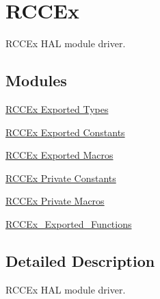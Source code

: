 \hypertarget{group___r_c_c_ex}{}\section{R\+C\+C\+Ex}
\label{group___r_c_c_ex}


R\+C\+C\+Ex H\+AL module driver.  


\subsection*{Modules}
\begin{DoxyCompactItemize}
\item 
\hyperlink{group___r_c_c_ex___exported___types}{R\+C\+C\+Ex Exported Types}
\item 
\hyperlink{group___r_c_c_ex___exported___constants}{R\+C\+C\+Ex Exported Constants}
\item 
\hyperlink{group___r_c_c_ex___exported___macros}{R\+C\+C\+Ex Exported Macros}
\item 
\hyperlink{group___r_c_c_ex___private___constants}{R\+C\+C\+Ex Private Constants}
\item 
\hyperlink{group___r_c_c_ex___private___macros}{R\+C\+C\+Ex Private Macros}
\item 
\hyperlink{group___r_c_c_ex___exported___functions}{R\+C\+C\+Ex\+\_\+\+Exported\+\_\+\+Functions}
\end{DoxyCompactItemize}


\subsection{Detailed Description}
R\+C\+C\+Ex H\+AL module driver. 

